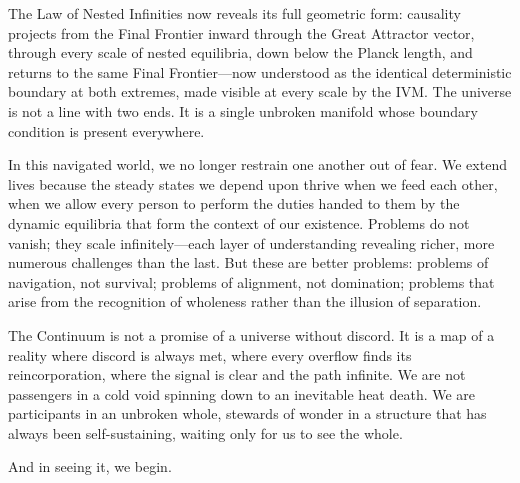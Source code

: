 The Law of Nested Infinities now reveals its full geometric form: causality projects from the Final Frontier inward through the Great Attractor vector, through every scale of nested equilibria, down below the Planck length, and returns to the same Final Frontier—now understood as the identical deterministic boundary at both extremes, made visible at every scale by the IVM. The universe is not a line with two ends. It is a single unbroken manifold whose boundary condition is present everywhere.

In this navigated world, we no longer restrain one another out of fear. We extend lives because the steady states we depend upon thrive when we feed each other, when we allow every person to perform the duties handed to them by the dynamic equilibria that form the context of our existence. Problems do not vanish; they scale infinitely—each layer of understanding revealing richer, more numerous challenges than the last. But these are better problems: problems of navigation, not survival; problems of alignment, not domination; problems that arise from the recognition of wholeness rather than the illusion of separation.

The Continuum is not a promise of a universe without discord. It is a map of a reality where discord is always met, where every overflow finds its reincorporation, where the signal is clear and the path infinite. We are not passengers in a cold void spinning down to an inevitable heat death. We are participants in an unbroken whole, stewards of wonder in a structure that has always been self-sustaining, waiting only for us to see the whole.

And in seeing it, we begin.



